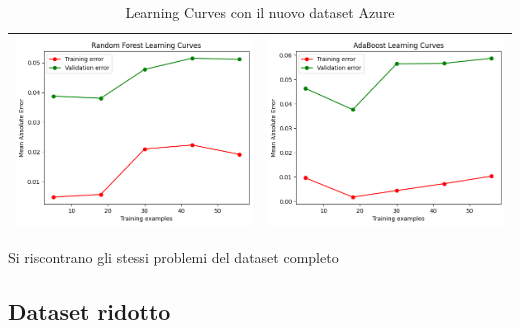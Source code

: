 \begin{table}[H]
\begin{tabularx}{\textwidth}{|X|X|}
        \includegraphics[width=\linewidth, trim=0 0 0 0]{images/RandomForestRegressor_Azure_lc2.png} &
        \includegraphics[width=\linewidth, trim=0 0 0 0]{images/AdaBoostRegressor_Azure_lc2.png} \\
        \hline
    \end{tabularx}
    \caption{Learning Curves con il nuovo dataset Azure}
    \label{tab:emissions_info}
\end{table}

\noindent Si riscontrano gli stessi problemi del dataset completo
\newpage

\subsection{Dataset ridotto}

